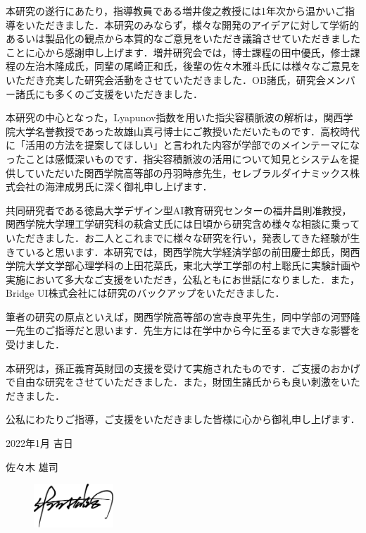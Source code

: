 \begin{acknowledgment}

本研究の遂行にあたり，指導教員である増井俊之教授には1年次から温かいご指導をいただきました．本研究のみならず，様々な開発のアイデアに対して学術的あるいは製品化の観点から本質的なご意見をいただき議論させていただきましたことに心から感謝申し上げます．増井研究会では，博士課程の田中優氏，修士課程の左治木隆成氏，同輩の尾崎正和氏，後輩の佐々木雅斗氏には様々なご意見をいただき充実した研究会活動をさせていただきました．OB諸氏，研究会メンバー諸氏にも多くのご支援をいただきました．

本研究の中心となった，Lyapunov指数を用いた指尖容積脈波の解析は，関西学院大学名誉教授であった故雄山真弓博士にご教授いただいたものです．高校時代に「活用の方法を提案してほしい」と言われた内容が学部でのメインテーマになったことは感慨深いものです．指尖容積脈波の活用について知見とシステムを提供していただいた関西学院高等部の丹羽時彦先生，セレブラルダイナミックス株式会社の海津成男氏に深く御礼申し上げます．

共同研究者である徳島大学デザイン型AI教育研究センターの福井昌則准教授，関西学院大学理工学研究科の萩倉丈氏には日頃から研究含め様々な相談に乗っていただきました．お二人とこれまでに様々な研究を行い，発表してきた経験が生きていると思います．本研究では，関西学院大学経済学部の前田慶士郎氏，関西学院大学文学部心理学科の上田花菜氏，東北大学工学部の村上聡氏に実験計画や実施において多大なご支援をいただき，公私ともにお世話になりました．また，Bridge UI株式会社には研究のバックアップをいただきました．

筆者の研究の原点といえば，関西学院高等部の宮寺良平先生，同中学部の河野隆一先生のご指導だと思います．先生方には在学中から今に至るまで大きな影響を受けました．

本研究は，孫正義育英財団の支援を受けて実施されたものです．ご支援のおかげで自由な研究をさせていただきました．また，財団生諸氏からも良い刺激をいただきました．

公私にわたりご指導，ご支援をいただきました皆様に心から御礼申し上げます．

\begin{flushright}
2022年1月 吉日

佐々木 雄司
\end{flushright}


\begin{figure}[htbp]
    \begin{flushright}
       \includegraphics[width=30mm]{img/signature.jpeg}
    \end{flushright}
\end{figure}



\end{acknowledgment}

